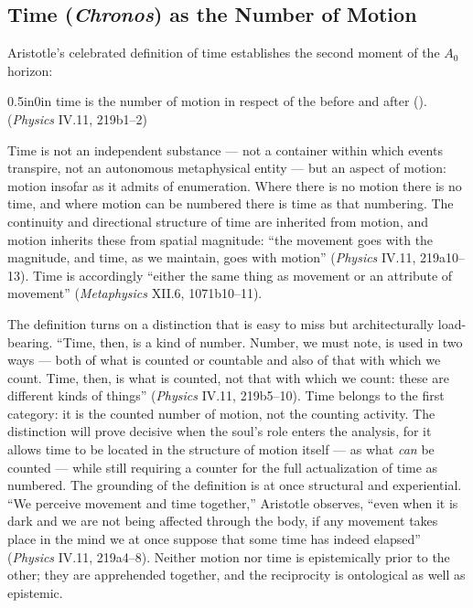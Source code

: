 \subsection{Time (\textit{Chronos}) as the Number of Motion}

Aristotle's celebrated definition of time establishes the second moment of the $A_0$ horizon:
\begin{adjustwidth}{0.5in}{0in}
time is the number of motion in respect of the before and after (). (\textit{Physics} IV.11, 219b1--2)
\end{adjustwidth}
Time is not an independent substance --- not a container within which events transpire, not an autonomous metaphysical entity --- but an aspect of motion: motion insofar as it admits of enumeration. Where there is no motion there is no time, and where motion can be numbered there is time as that numbering. The continuity and directional structure of time are inherited from motion, and motion inherits these from spatial magnitude: ``the movement goes with the magnitude, and time, as we maintain, goes with motion'' (\textit{Physics} IV.11, 219a10--13). Time is accordingly ``either the same thing as movement or an attribute of movement'' (\textit{Metaphysics} XII.6, 1071b10--11).

The definition turns on a distinction that is easy to miss but architecturally load-bearing. ``Time, then, is a kind of number. Number, we must note, is used in two ways --- both of what is counted or countable and also of that with which we count. Time, then, is what is counted, not that with which we count: these are different kinds of things'' (\textit{Physics} IV.11, 219b5--10). Time belongs to the first category: it is the counted number of motion, not the counting activity. The distinction will prove decisive when the soul's role enters the analysis, for it allows time to be located in the structure of motion itself --- as what \textit{can} be counted --- while still requiring a counter for the full actualization of time as numbered. The grounding of the definition is at once structural and experiential. ``We perceive movement and time together,'' Aristotle observes, ``even when it is dark and we are not being affected through the body, if any movement takes place in the mind we at once suppose that some time has indeed elapsed'' (\textit{Physics} IV.11, 219a4--8). Neither motion nor time is epistemically prior to the other; they are apprehended together, and the reciprocity is ontological as well as epistemic.


